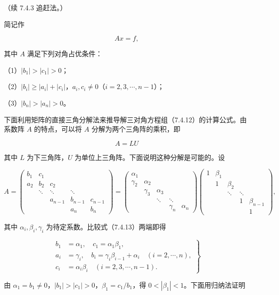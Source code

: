 \documentclass[
  10pt,
  fontset=fandol]{ctexart}
\begin{document}
（续 7.4.3 追赶法。）

简记作

\[
Ax=f,
\tag{7.4.12}
\]

其中 \(A\) 满足下列对角占优条件：

（1）\(|b_1|>|c_1|>0\)；

（2）\(|b_i|\geqslant|a_i|+|c_i|\)，\(a_i,c_i\neq0\)（\(i=2,3,\cdots,n-1\)）；

（3）\(|b_n|>|a_n|>0\)。

下面利用矩阵的直接三角分解法来推导解三对角方程组（7.4.12）的计算公式。由系数阵
\(A\) 的特点，可以将 \(A\) 分解为两个三角阵的乘积，即

\[
A=LU
\]

其中 \(L\) 为下三角阵，\(U\)
为单位上三角阵。下面说明这种分解是可能的。设

\[
A=\begin{pmatrix}
b_1&c_1&&&\\
a_2&b_2&c_2&&\\
&\ddots&\ddots&\ddots&\\
&&a_{n-1}&b_{n-1}&c_{n-1}\\
&&&a_n&b_n
\end{pmatrix}
=\begin{pmatrix}
\alpha_1&&&&\\
\gamma_2&\alpha_2&&&\\
&\gamma_3&\alpha_3&&\\
&&\ddots&\ddots&\\
&&&\gamma_n&\alpha_n
\end{pmatrix}
\begin{pmatrix}
1&\beta_1&&&\\
&1&\beta_2&&\\
&&\ddots&\ddots&\\
&&&1&\beta_{n-1}\\
&&&&1
\end{pmatrix},
\tag{7.4.13}
\]

其中 \(\alpha_i,\beta_i,\gamma_i\) 为待定系数。比较式（7.4.13）两端即得

\[
\left.\begin{aligned}
b_1&=\alpha_1,\quad c_1=\alpha_1\beta_1,\\
a_i&=\gamma_i,\quad b_i=\gamma_i\beta_{i-1}+\alpha_i\quad(i=2,\cdots,n),\\
c_i&=\alpha_i\beta_i\quad(i=2,3,\cdots,n-1).
\end{aligned}\right\}
\tag{7.4.14}
\]

由 \(\alpha_1=b_1\neq0\)，\(|b_1|>|c_1|>0\)，\(\beta_1=c_1/b_1\)，得
\(0<|\beta_1|<1\)。下面用归纳法证明
\end{document}
